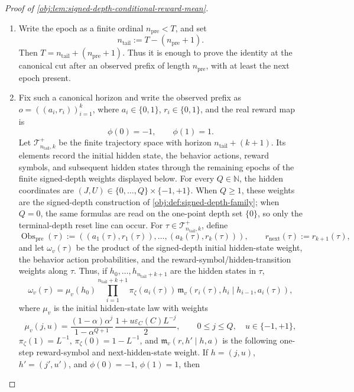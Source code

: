 \begin{proof}[Proof of \cref{obj:lem:signed-depth-conditional-reward-mean}]
\begin{enumerate}
\item
Write the epoch as a finite ordinal \(n_{\mathrm{pre}}<T\), and set
\[
n_{\mathrm{tail}}:=T-(n_{\mathrm{pre}}+1).
\]
Then \(T=n_{\mathrm{tail}}+(n_{\mathrm{pre}}+1)\). Thus it is enough to prove the identity at the canonical cut after an observed prefix of length \(n_{\mathrm{pre}}\), with at least the next epoch present. %

\item
Fix such a canonical horizon and write the observed prefix as
\(o=((a_i,r_i))_{i=1}^k\), where \(a_i\in\{0,1\}\), \(r_i\in\{0,1\}\), and the real reward map is
\[
\phi(0)=-1,
\qquad
\phi(1)=1.
\]
Let \(\mathcal T^+_{n_{\mathrm{tail}},k}\) be the finite trajectory space with horizon \(n_{\mathrm{tail}}+(k+1)\). Its elements record the initial hidden state, the behavior actions, reward symbols, and subsequent hidden states through the remaining epochs of the finite signed-depth weights displayed below. For every \(Q\in\mathbb N\), the hidden coordinates are \((J,U)\in\{0,\ldots,Q\}\times\{-1,+1\}\). When \(Q\ge 1\), these weights are the signed-depth construction of \cref{obj:def:signed-depth-family}; when \(Q=0\), the same formulas are read on the one-point depth set \(\{0\}\), so only the terminal-depth reset line can occur. For \(\tau\in\mathcal T^+_{n_{\mathrm{tail}},k}\), define
\[
\operatorname{Obs}_{\mathrm{pre}}(\tau)
:=((a_1(\tau),r_1(\tau)),\ldots,(a_k(\tau),r_k(\tau))),
\qquad
r_{\mathrm{next}}(\tau):=r_{k+1}(\tau),
\]
and let \(\omega_v(\tau)\) be the product of the signed-depth initial hidden-state weight, the behavior action probabilities, and the reward-symbol/hidden-transition weights along \(\tau\). Thus, if \(h_0,\ldots,h_{n_{\mathrm{tail}}+k+1}\) are the hidden states in \(\tau\),
\[
\omega_v(\tau)
=
\mu_v(h_0)
\prod_{i=1}^{n_{\mathrm{tail}}+k+1}
\pi_\zeta(a_i(\tau))\,
\mathfrak m_v(r_i(\tau),h_i\mid h_{i-1},a_i(\tau)),
\]
where \(\mu_v\) is the initial hidden-state law with weights
\[
\mu_v(j,u)
=
\frac{(1-\alpha)\alpha^j}{1-\alpha^{Q+1}}\,
\frac{1+u\varepsilon_C(C)L^{-j}}{2},
\qquad 0\le j\le Q,
\quad u\in\{-1,+1\},
\]
\(\pi_\zeta(1)=L^{-1}\), \(\pi_\zeta(0)=1-L^{-1}\), and \(\mathfrak m_v(r,h'\mid h,a)\) is the following one-step reward-symbol and next-hidden-state weight. If \(h=(j,u)\), \(h'=(j',u')\), and \(\phi(0)=-1\), \(\phi(1)=1\), then

\end{enumerate}
\end{proof}
